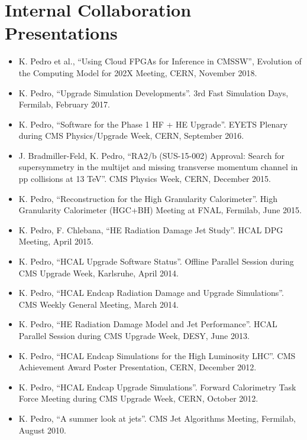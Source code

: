 \ifdefined\longestflag
\section{Internal Collaboration Presentations}
\begin{itemize}[leftmargin=12pt]
\item K. Pedro et al., ``Using Cloud FPGAs for Inference in CMSSW'', Evolution of the Computing Model for 202X Meeting, CERN, November 2018.
\item K. Pedro, ``Upgrade Simulation Developments''. 3rd Fast Simulation Days, Fermilab, February 2017.
\item K. Pedro, ``Software for the Phase 1 HF + HE Upgrade''. EYETS Plenary during CMS Physics/Upgrade Week, CERN, September 2016.
\item J. Bradmiller-Feld, K. Pedro, ``RA2/b (SUS-15-002) Approval: Search for supersymmetry in the multijet and missing transverse momentum channel in pp collisions at 13 TeV''. CMS Physics Week, CERN, December 2015.
\item K. Pedro, ``Reconstruction for the High Granularity Calorimeter''. High Granularity Calorimeter (HGC+BH) Meeting at FNAL, Fermilab, June 2015.
\item K. Pedro, F. Chlebana, ``HE Radiation Damage Jet Study''. HCAL DPG Meeting, April 2015.
\item K. Pedro, ``HCAL Upgrade Software Status''. Offline Parallel Session during CMS Upgrade Week, Karlsruhe, April 2014.
\item K. Pedro, ``HCAL Endcap Radiation Damage and Upgrade Simulations''. CMS Weekly General Meeting, March 2014.
\item K. Pedro, ``HE Radiation Damage Model and Jet Performance''. HCAL Parallel Session during CMS Upgrade Week, DESY, June 2013.
\item K. Pedro, ``HCAL Endcap Simulations for the High Luminosity LHC''. CMS Achievement Award Poster Presentation, CERN, December 2012.
\item K. Pedro, ``HCAL Endcap Upgrade Simulations''. Forward Calorimetry Task Force Meeting during CMS Upgrade Week, CERN, October 2012.
\item K. Pedro, ``A summer look at jets''. CMS Jet Algorithms Meeting, Fermilab, August 2010.
\end{itemize}
\fi